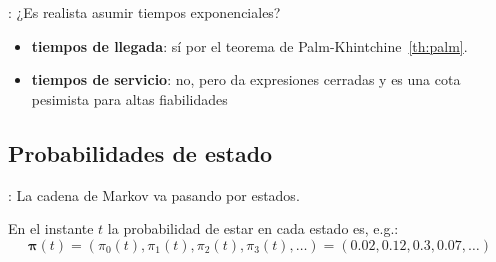 \documentclass{beamer}
\begin{document}
\begin{frame}{\secname: \subsecname}
    ¿Es realista asumir tiempos exponenciales?
    \begin{itemize}
        \item \textbf{tiempos de llegada}: sí por
            el teorema de
            Palm-Khintchine~\ref{th:palm}.\pause
        \item \textbf{tiempos de servicio}:
            no, pero da expresiones cerradas
            y es una cota pesimista para altas
            fiabilidades
    \end{itemize}

    \vfill

    
    \begin{figure}
        
    \end{figure}
\end{frame}








\subsection{Probabilidades de estado}




\begin{frame}{\secname: \subsecname}
    La cadena de Markov va pasando
    por estados.

    En el instante $t$ la
    probabilidad de estar en cada estado es,
    e.g.:
    \begin{equation*}
        \pmb{\pi}(t) = (\pi_0(t), \pi_1(t), \pi_2(t), \pi_3(t), \ldots) = (0.02, 0.12, 0.3, 0.07, \ldots)
    \end{equation*}

    \begin{figure}
        
    \end{figure}


\end{frame}
\end{document}
